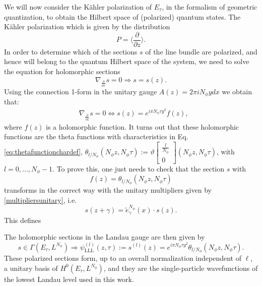 \documentclass[a4paper,11pt]{article}
\begin{document}
We will now consider the K\"ahler polarization of $E_\tau$, in the formalism of geometric quantization, to obtain the Hilbert space of (polarized) quantum states.  The Kähler polarization which is given by the distribution
\begin{equation}
  P = \Big\langle \frac{\partial}{\partial z}\Big\rangle. 
\end{equation}
In order to determine which of the sections $s$ of the line bundle are polarized, and hence will belong to the quantum Hilbert space of the system, we need to solve the equation for holomorphic sections
\begin{equation}
\nabla_{\frac{\partial}{\partial\bar{z}}}s = 0 \Rightarrow s = s(z).
\end{equation}
Using the connection 1-form in the unitary gauge $A(z) = 2\pi iN_{\phi}y dx$ we obtain that:
\begin{align*}
&\nabla_{\frac{\partial}{\partial\bar{z}}}s=0 \Leftrightarrow s(z) = e^{i\pi N_{\phi}\tau y^2}f(z),
\end{align*}
where $f(z)$ is a holomorphic function. It turns out that these holomorphic functions are the theta functions with characteristics in Eq.\eqref{eq:thetafunctionchardef}, $\theta_{l/N_{\phi}}(N_{\phi}z,N_{\phi}\tau):=\vartheta\begin{bmatrix}
\tfrac{l}{N_{\phi}}\\
0
\end{bmatrix}(N_{\phi}z,N_{\phi}\tau)$, with $l=0,...,N_{\phi}-1$. To prove this, one just needs to check that the section $s$ with $$f(z) = \theta_{l/N_{\phi}}(N_{\phi}z,N_{\phi}\tau)$$ transforms in the correct way with the unitary multipliers given by \eqref{multipliersunitary}, i.e. $$s(z+\gamma)=\widetilde{e}^{N_{\phi}}_{\gamma}(x)\cdot s(z).$$  
This defines 

The holomorphic sections in the Landau gauge are then given by
\begin{equation}
s\in\Gamma(E_{\tau},L^{N_{\phi}})\Rightarrow \psi^{(l)}_{\mathrm{LLL}}(z,\tau):= s^{(l)}(z) = e^{i\pi N_{\phi}\tau y^2}\theta_{l/N_{\phi}}(N_{\phi}z,N_{\phi}\tau).
\label{LLLunitary}
\end{equation}
These polarized sections form, up to an overall normalization independent of $\ell$, a unitary basis of $H^0(E_\tau, L^{N_\phi})$, and they are the single-particle wavefunctions of the lowest Landau level used in this work.
\end{document}
